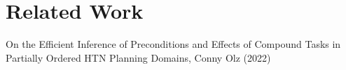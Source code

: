 \chapter{Related Work}\label{chap:relatedWork}

On the Efficient Inference of Preconditions and Effects of Compound Tasks in
Partially Ordered HTN Planning Domains, Conny Olz (2022)


